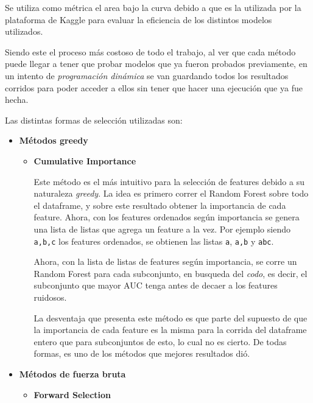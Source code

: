 \documentclass[a4paper]{article}
\begin{document}
Se utiliza como métrica el area bajo la curva debido a que es la utilizada por la plataforma de Kaggle para evaluar la eficiencia de los distintos modelos utilizados. 

Siendo este el proceso más costoso de todo el trabajo, al ver que cada método puede llegar a tener que probar modelos que ya fueron probados previamente, en un intento de \textit{programación dinámica} se van guardando todos los resultados corridos para poder acceder a ellos sin tener que hacer una ejecución que ya fue hecha.

Las distintas formas de selección utilizadas son:

\begin {itemize}

\item \textbf{Métodos greedy}

\begin {itemize}

	\item \textbf{Cumulative Importance}

	Este método es el más intuitivo para la selección de features debido a su naturaleza \textit{greedy}. La idea es primero correr el Random Forest sobre todo el dataframe, y sobre este resultado obtener la importancia de cada feature. Ahora, con los features ordenados según importancia se genera una lista de listas que agrega un feature a la vez. Por ejemplo siendo \texttt{a,b,c} los features ordenados, se obtienen las listas \texttt{a}, \texttt{a,b} y  \texttt{abc}.

	Ahora, con la lista de listas de features según importancia, se corre un Random Forest para cada subconjunto, en busqueda del \textit{codo}, es decir, el subconjunto que mayor AUC tenga antes de decaer a los features ruidosos.

	La desventaja que presenta este método es que parte del supuesto de que la importancia de cada feature es la misma para la corrida del dataframe entero que para subconjuntos de esto, lo cual no es cierto. De todas formas, es uno de los métodos que mejores resultados dió.

\end{itemize}

\item \textbf{Métodos de fuerza bruta}

\begin{itemize}

	\item \textbf{Forward Selection}


\end{itemize}
\end{itemize}
\end{document}

